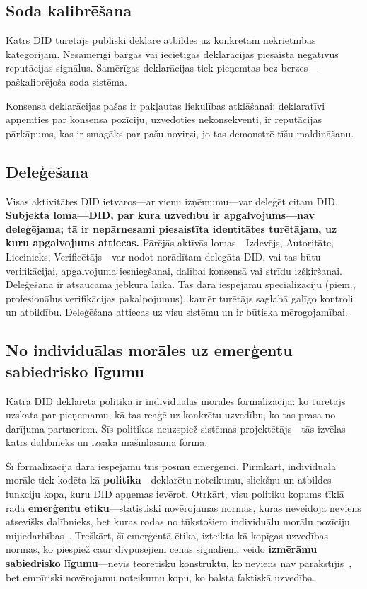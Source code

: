\documentclass[11pt,a4paper,twocolumn]{article}
\begin{document}
\subsection{Soda kalibrēšana}

Katrs DID turētājs publiski deklarē atbildes uz konkrētām nekrietnības kategorijām. Nesamērīgi bargas vai iecietīgas deklarācijas piesaista negatīvus reputācijas signālus. Samērīgas deklarācijas tiek pieņemtas bez berzes---paškalibrējoša soda sistēma.

Konsensa deklarācijas pašas ir pakļautas liekulības atklāšanai: deklaratīvi apņemties par konsensa pozīciju, uzvedoties nekonsekventi, ir reputācijas pārkāpums, kas ir smagāks par pašu novirzi, jo tas demonstrē tīšu maldināšanu.

\subsection{Deleģēšana}

Visas aktivitātes DID ietvaros---ar vienu izņēmumu---var deleģēt citam DID. \textbf{Subjekta loma---DID, par kura uzvedību ir apgalvojums---nav deleģējama; tā ir nepārnesami piesaistīta identitātes turētājam, uz kuru apgalvojums attiecas.} Pārējās aktīvās lomas---Izdevējs, Autoritāte, Liecinieks, Verificētājs---var nodot norādītam delegāta DID, vai tas būtu verifikācijai, apgalvojuma iesniegšanai, dalībai konsensā vai strīdu izšķiršanai. Deleģēšana ir atsaucama jebkurā laikā. Tas dara iespējamu specializāciju (piem., profesionālus verifikācijas pakalpojumus), kamēr turētājs saglabā galīgo kontroli un atbildību. Deleģēšana attiecas uz visu sistēmu un ir būtiska mērogojamībai.

\subsection{No individuālas morāles uz emerģentu sabiedrisko līgumu}

Katra DID deklarētā politika ir individuālas morāles formalizācija: ko turētājs uzskata par pieņemamu, kā tas reaģē uz konkrētu uzvedību, ko tas prasa no darījuma partneriem. Šīs politikas neuzspiež sistēmas projektētājs---tās izvēlas katrs dalībnieks un izsaka mašīnlasāmā formā.

Šī formalizācija dara iespējamu trīs posmu emerģenci. Pirmkārt, individuālā morāle tiek kodēta kā \textbf{politika}---deklarētu noteikumu, sliekšņu un atbildes funkciju kopa, kuru DID apņemas ievērot. Otrkārt, visu politiku kopums tīklā rada \textbf{emerģentu ētiku}---statistiski novērojamas normas, kuras neveidoja neviens atsevišķs dalībnieks, bet kuras rodas no tūkstošiem individuālu morālu pozīciju mijiedarbības~\cite{durkheim1893}. Treškārt, šī emerģentā ētika, izteikta kā kopīgas uzvedības normas, ko piespiež caur divpusējiem cenas signāliem, veido \textbf{izmērāmu sabiedrisko līgumu}---nevis teorētisku konstruktu, ko neviens nav parakstījis~\cite{rawls1971}, bet empīriski novērojamu noteikumu kopu, ko balsta faktiskā uzvedība.
\end{document}
